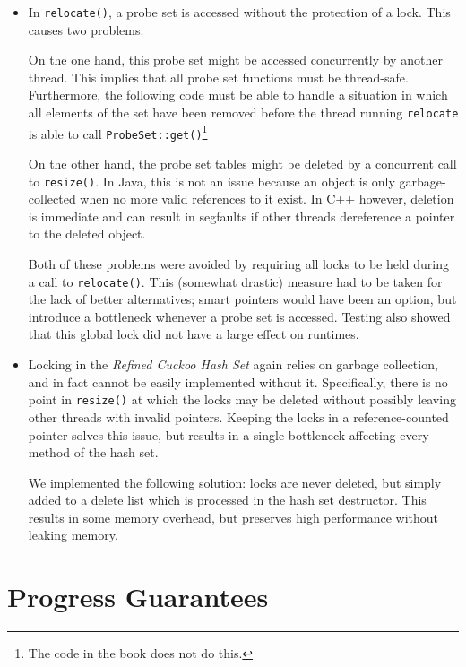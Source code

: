 \documentclass[a4paper,10pt]{article}
\begin{document}
\begin{itemize}
\item In \lstinline|relocate()|, a probe set is accessed without the
    protection of a lock. This causes two problems:
    
    On the one hand, this probe set might be accessed concurrently
    by another thread. This implies that all probe set functions must be
    thread-safe. Furthermore, the following code must be able to handle a
    situation in which all elements of the set have been removed before the
    thread running \lstinline|relocate| is able to call
    \lstinline|ProbeSet::get()|\footnote{The code in the book does not do
    this.}
    
    On the other hand, the probe set tables might be deleted by a concurrent
    call to \lstinline|resize()|. In Java, this is not an issue because an
    object is only garbage-collected when no more valid references to it exist.
    In C++ however, deletion is immediate and can result in segfaults if other
    threads dereference a pointer to the deleted object. 
    
    Both of these problems were avoided by requiring all locks to be held during
    a call to \lstinline|relocate()|. This (somewhat drastic) measure had to be
    taken for the lack of better alternatives; smart pointers would have been
    an option, but introduce a bottleneck whenever a probe set is accessed.
    Testing also showed that this global lock did not have a large effect on runtimes.

\item Locking in the \emph{Refined Cuckoo Hash Set} again relies on garbage collection, and
    in fact cannot be easily implemented without it. Specifically, there is no point
    in \lstinline|resize()| at which the locks may be deleted without possibly leaving
    other threads with invalid pointers. Keeping the locks in a reference-counted pointer
    solves this issue, but results in a single bottleneck affecting every method of the 
    hash set.
    
    We implemented the following solution: locks are never deleted, but simply added
    to a delete list which is processed in the hash set destructor. This results in
    some memory overhead, but preserves high performance without leaking memory.
\end{itemize}

\section{Progress Guarantees}
\label{sec:progressGuarantees}
\end{document}
